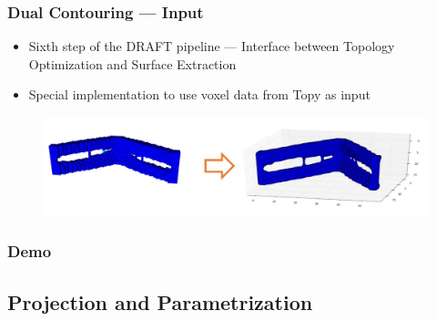 \begin{frame}

	\frametitle{Dual Contouring --- Input}
	
	\begin{itemize}
	\item  Sixth step of the DRAFT pipeline --- Interface between Topology Optimization and Surface Extraction
	\item Special implementation to use voxel data from Topy as input
	\end{itemize}
	\begin{figure}
	\includegraphics[scale=0.35]{Pictures/DC/cantilever.pdf}
	\end{figure}
	
\end{frame}

\begin{frame}

	\frametitle{Demo}
	

\end{frame}

\subsection{Projection and Parametrization}

